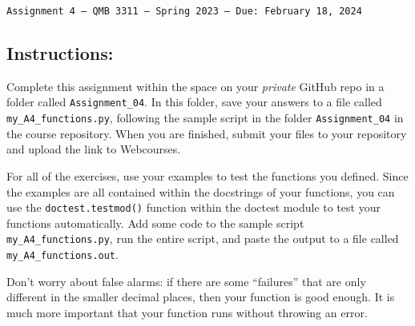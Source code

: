 \documentclass[11pt]{exam}
\begin{document}
\texttt{Assignment 4 --- QMB 3311 ---  Spring 2023  --- Due: February 18, 2024}

\subsection*{Instructions:}

Complete this assignment within the space on your \textit{private} GitHub repo in a folder called \texttt{Assignment\_04}. In this folder, save your answers to a file called \texttt{my\_A4\_functions.py}, following the sample script in the folder \texttt{Assignment\_04} in the course repository. When you are finished, submit your files to your repository and upload the link to Webcourses.

For all of the exercises, use your examples to test the functions you defined. Since the examples are all contained within the docstrings of your functions, you can use the
\texttt{doctest.testmod()} function within the doctest module to test your functions automatically. Add some code to the sample script \texttt{my\_A4\_functions.py}, run the entire script, and paste the output to a file called \texttt{my\_A4\_functions.out}.

Don't worry about false alarms: if there are some ``failures'' that are only different in the smaller decimal places, then your function is good enough. It is much more important that your function runs without throwing an error.
\end{document}
